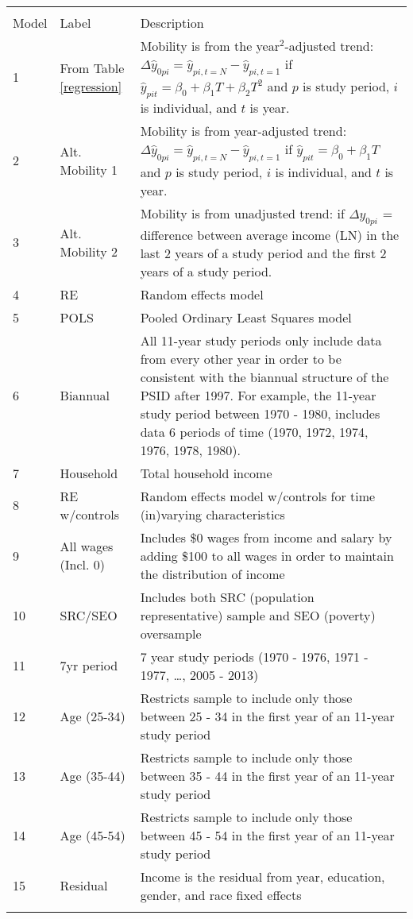 \documentclass[12pt]{article}
\begin{document}
\begin{tabular*}{\textwidth}{@{\extracolsep{\fill}}l l p{10cm}}
\\[-1.8ex]\hline 
\hline \\[-1.8ex] 
Model & Label & Description \\ \hline
1 & From Table \ref{regression}  & Mobility is from the year$^2$-adjusted trend: $\Delta \hat{y}_{0pi} = \hat{y}_{pi,t=N} - \hat{y}_{pi,t=1}$ if $\hat{y}_{pit} = \beta_0 + \beta_{1} T + \beta_{2} T^2$ and $p$ is study period, $i$ is individual, and $ t $ is year. \\
2 & Alt. Mobility 1     &  Mobility is from year-adjusted trend: $\Delta \hat{y}_{0pi} = \hat{y}_{pi,t=N} - \hat{y}_{pi,t=1}$ if $\hat{y}_{pit} = \beta_0 + \beta_{1} T$ and $p$ is study period, $i$ is individual, and $ t $ is year. \\
3 & Alt. Mobility 2     & Mobility is  from unadjusted trend: if $\Delta y_{0pi}$ = difference between average income (LN) in the last 2 years of a study period and the first 2 years of a study period.\\
4 & RE                  & Random effects model \\
5 & POLS                & Pooled Ordinary Least Squares model \\
6 & Biannual            & All 11-year study periods only include data from every other year in order to be consistent with the biannual structure of the PSID after 1997.  For example, the 11-year study period between 1970 - 1980, includes data 6 periods of time (1970, 1972, 1974, 1976, 1978, 1980). \\
7 & Household           & Total household income \\
8 & RE w/controls       & Random effects model w/controls for time (in)varying characteristics \\
9 & All wages (Incl. 0) & Includes \$0 wages from income and salary by adding \$100 to all wages in order to maintain the distribution of income \\
10 & SRC/SEO            & Includes both SRC (population representative) sample and SEO (poverty) oversample  \\
11 & 7yr period         & 7 year study periods (1970 - 1976, 1971 - 1977, \dots, 2005 - 2013) \\
12 & Age (25-34)        & Restricts sample to include only those between 25 - 34 in the first year of an 11-year study period \\
13 & Age (35-44)        & Restricts sample to include only those between 35 - 44 in the first year of an 11-year study period \\
14 & Age (45-54)        & Restricts sample to include only those between 45 - 54 in the first year of an 11-year study period \\
15 & Residual           & Income is the residual from year, education, gender, and race fixed effects \\
\hline 
\hline \\[-1.8ex] 
\end{tabular*}
\end{document}
